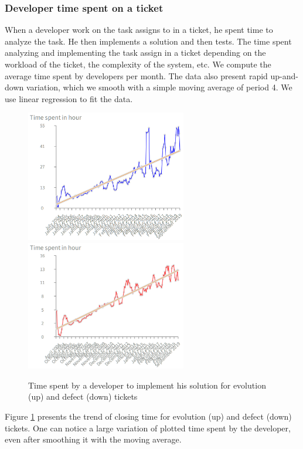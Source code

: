 \documentclass[10pt,conference]{IEEEtran}
\begin{document}
\subsubsection{Developer time spent on a ticket}

When a developer work on the task assigns to in a ticket, he spent time to analyze the task. 
He then implements a solution and then tests.
 The time spent analyzing and implementing the task assign in a ticket depending on the workload of the ticket, the complexity of the system, etc.  
We compute the average time spent by developers per month. 
The data also present rapid up-and-down variation, which we smooth with a simple moving average of period 4. We use linear regression to fit the data.   

\begin{figure}[htbp]
  \centering
  \includegraphics[width=70mm]{./images/devEvol.png}\\
  \includegraphics[width=70mm]{./images/devDefect.png}
  \caption{Time spent by a developer to implement his solution for  evolution (up) and defect (down) tickets}
  \label{fig:devTimeDev}
\end{figure}

Figure \ref{fig:devTimeDev} presents the trend of closing time for evolution (up) and defect (down) tickets.
One can notice a large variation of plotted time spent by the developer, even after smoothing it with the moving average.
\end{document}

